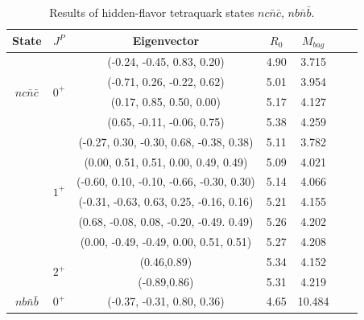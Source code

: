 \documentclass[prd,twocolumn,floatfix,nofootinbib]{revtex4}
\begin{document}
\renewcommand{\tabcolsep}{0.84cm}
\renewcommand{\arraystretch}{1.2}
\begin{table}[!htbp]
    \caption{Results of hidden-flavor tetraquark states $nc\bar{n}\bar{c}$, $nb\bar{n}\bar{b}$.}
    \label{tab:hiddenflavor-nQnQ}
    \begin{tabular}{ccccccc}
        \hline\hline
        {\rm State}     &$J^{P}$    &{\rm Eigenvector}                          &$R_{0}$    &$M_{bag}$ \\ \hline
        \multirow{4}{*}{$nc\bar{n}\bar{c}$}
                        &\multirow{4}{*}{$0^{+}$}         
                                    &(-0.24, -0.45, 0.83, 0.20)                 &4.90	    &3.715 \\ 
                        &           &(-0.71, 0.26, -0.22, 0.62)                 &5.01	    &3.954 \\ 
                        &           &(0.17, 0.85, 0.50, 0.00)                   &5.17	    &4.127 \\ 
                        &           &(0.65, -0.11, -0.06, 0.75)                 &5.38	    &4.259 \\ 
                        &\multirow{6}{*}{$1^{+}$}
                                    &(-0.27, 0.30, -0.30, 0.68, -0.38, 0.38)    &5.11	    &3.782 \\ 
                        &           &(0.00, 0.51, 0.51, 0.00, 0.49, 0.49)       &5.09	    &4.021 \\ 
                        &           &(-0.60, 0.10, -0.10, -0.66, -0.30, 0.30)   &5.14	    &4.066 \\ 
                        &           &(-0.31, -0.63, 0.63, 0.25, -0.16, 0.16)    &5.21	    &4.155 \\ 
                        &           &(0.68, -0.08, 0.08, -0.20, -0.49. 0.49)    &5.26	    &4.202 \\ 
                        &           &(0.00, -0.49, -0.49, 0.00, 0.51, 0.51)     &5.27	    &4.208 \\ 
                        &\multirow{2}{*}{$2^{+}$}    
                                    &(0.46,0.89)                                &5.34	    &4.152 \\ 
                        &           &(-0.89,0.86)                               &5.31	    &4.219 \\ 
        \multirow{4}{*}{$nb\bar{n}\bar{b}$}
                        &\multirow{4}{*}{$0^{+}$}
                                    &(-0.37, -0.31, 0.80, 0.36)                 &4.65	    &10.484 \\ 

\end{tabular}
\end{table}
\end{document}
